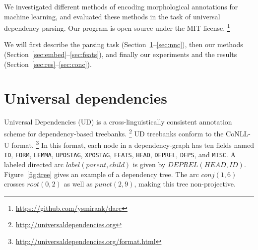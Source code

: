 \documentclass[11pt]{article}
\begin{document}
We investigated different methods of encoding morphological annotations for machine learning,
and evaluated these methods in the task of universal dependency parsing.
Our program is open source under the MIT license.%
\footnote{\url{https://github.com/ysmiraak/darc}}

We will first describe the parsing task (Section~\ref{sec:ud}--\ref{sec:nnc}),
then our methods (Section~\ref{sec:embed}--\ref{sec:feats}),
and finally our experiments and the results (Section~\ref{sec:res}--\ref{sec:conc}).

\section{Universal dependencies}
\label{sec:ud}

Universal Dependencies (UD) \parencite{ud} is a cross-linguistically consistent annotation scheme for dependency-based treebanks.%
\footnote{\url{http://universaldependencies.org}}
UD treebanks conform to the CoNLL-U format.%
\footnote{\url{http://universaldependencies.org/format.html}}
In this format, each node in a dependency-graph has ten fields named
\texttt{ID}, \texttt{FORM}, \texttt{LEMMA}, \texttt{UPOSTAG}, \texttt{XPOSTAG}, \texttt{FEATS}, \texttt{HEAD}, \texttt{DEPREL}, \texttt{DEPS}, and \texttt{MISC}.
A labeled directed arc \(label(parent, child)\) is given by \(DEPREL(HEAD, ID)\).
Figure~\ref{fig:tree} gives an example of a dependency tree.
The arc \(conj(1,6)\) crosses \(root(0,2)\) as well as \(punct(2,9)\),
making this tree non-projective.
\end{document}
